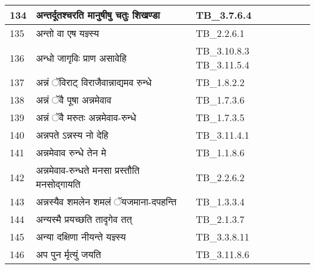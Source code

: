 \documentclass[17pt]{extarticle}
\begin{document}
\begin{longtable}{||p{0.4in}||p{4.9in}||p{0.9in}||}
    \hline
        
    134 & अन्तर्दूतश्चरति मानुषीषु चतुः शिखण्डा & TB\_3.7.6.4       \\
    
    \hline
        
    135 & अन्तो वा एष यज्ञ्स्य & TB\_2.2.6.1       \\
    
    \hline
        
    136 & अन्धो जागृविः प्राण असावेहि & TB\_3.10.8.3 TB\_3.11.5.4       \\
    
    \hline
        
    137 & अन्नं ॅविराट् विराजैवान्नाद्यमव रुन्धे & TB\_1.8.2.2       \\
    
    \hline
        
    138 & अन्नं ॅवै पूषा अन्नमेवाव & TB\_1.7.3.6       \\
    
    \hline
        
    139 & अन्नं ॅवै मरुतः अन्नमेवाव{-}रुन्धे & TB\_1.7.3.5       \\
    
    \hline
        
    140 & अन्नपते ऽन्नस्य नो देहि & TB\_3.11.4.1       \\
    
    \hline
        
    141 & अन्नमेवाव रुन्धे तेन मे & TB\_1.1.8.6       \\
    
    \hline
        
    142 & अन्नमेवाव{-}रुन्धते मनसा प्रस्तौति मनसोद्गायति & TB\_2.2.6.2       \\
    
    \hline
        
    143 & अन्नस्यैव शमलेन शमलं ॅयजमाना{-}दपहन्ति & TB\_1.3.3.4       \\
    
    \hline
        
    144 & अन्यस्मै प्रयच्छति तादृगेव तत् & TB\_2.1.3.7       \\
    
    \hline
        
    145 & अन्या दक्षिणा नीयन्ते यज्ञ्स्य & TB\_3.3.8.11       \\
    
    \hline
        
    146 & अप पुन र्मृत्युं जयति & TB\_3.11.8.6       \\
    

\end{longtable}
\end{document}
